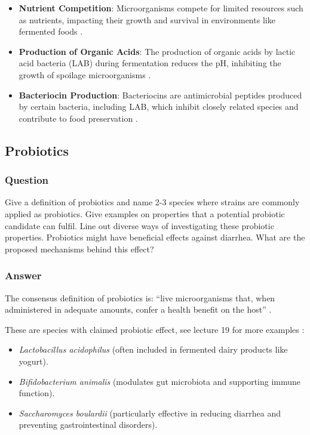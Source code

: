\begin{itemize}
    \item \textbf{Nutrient Competition}: Microorganisms compete for limited resources such as nutrients, impacting their growth and survival in environments like fermented foods \cite*{L8-ImpQuorum}.
    \item \textbf{Production of Organic Acids}: The production of organic acids by lactic acid bacteria (LAB) during fermentation reduces the pH, inhibiting the growth of spoilage microorganisms \cite*{L8-ImpQuorum}.
    \item \textbf{Bacteriocin Production}: Bacteriocins are antimicrobial peptides produced by certain bacteria, including LAB, which inhibit closely related species and contribute to food preservation \cite*{L8-ImpQuorum}.
\end{itemize}

\subsection{Probiotics}
\subsubsection*{Question}
Give a definition of probiotics and name 2-3 species where strains are commonly applied as probiotics. Give examples on properties that a potential probiotic candidate can fulfil. Line out diverse ways of investigating these probiotic properties. Probiotics might have beneficial effects against diarrhea. What are the proposed mechanisms behind this effect?

\subsubsection*{Answer}
The consensus definition of probiotics is: “live microorganisms that, when administered in adequate amounts, confer a health benefit on the host” \cite*{L10-Pro_Pre}.

These are species with claimed probiotic effect, see lecture 19 for more examples \cite*{LS19}:
\begin{itemize}
    \item \textit{Lactobacillus acidophilus} (often included in fermented dairy products like yogurt).
    \item \textit{Bifidobacterium animalis} (modulates gut microbiota and supporting immune function).
    \item \textit{Saccharomyces boulardii} (particularly effective in reducing diarrhea and preventing gastrointestinal disorders).
\end{itemize}

